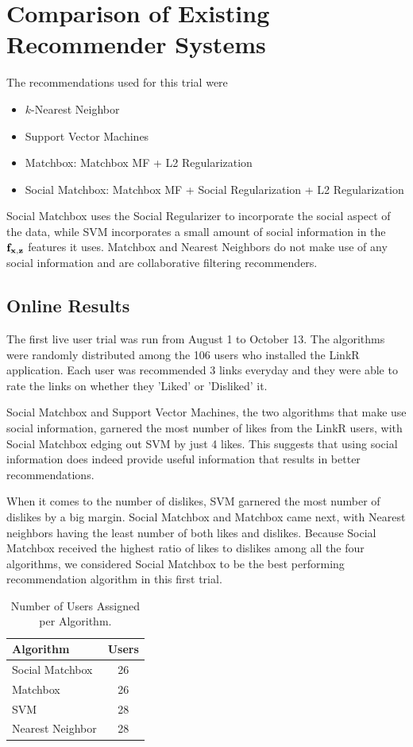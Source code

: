 \chapter{Comparison of Existing Recommender Systems}

The recommendations used for this trial were 

\begin{itemize}
\item{$k$-Nearest Neighbor}
\item{Support Vector Machines}
\item{Matchbox: Matchbox MF  + L2 Regularization}
\item{Social Matchbox: Matchbox MF + Social Regularization + L2 Regularization}
\end{itemize}

Social Matchbox uses the Social Regularizer to incorporate the social aspect of the data, while SVM incorporates a small amount of social information in the $\mathbf{f}_{\mathbf{x},\mathbf{z}}$ features it uses. Matchbox and Nearest Neighbors do not make use of any social information and are collaborative filtering recommenders.

\section{Online Results}

The first live user trial was run from August 1 to October 13. The algorithms were randomly distributed among the 106 users who installed the LinkR application. Each user was recommended 3 links everyday and they were able to rate the links on whether they 'Liked' or 'Disliked' it. 

Social Matchbox and Support Vector Machines, the two algorithms that make use social information, garnered the most number of likes from the LinkR users, with Social Matchbox edging out SVM by just 4 likes. This suggests that using social information does indeed provide useful information that results in better recommendations.

When it comes to the number of dislikes, SVM garnered the most number of dislikes by a big margin. Social Matchbox and Matchbox came next, with Nearest neighbors having the least number of both likes and dislikes. Because Social Matchbox received the highest ratio of likes to dislikes among all the four algorithms, we considered Social Matchbox to be the best performing recommendation algorithm in this first trial.

\begin{table}[h!]
\centering
\begin{tabular}{| l | c |}
\hline
{\bf Algorithm} & {\bf Users} \\
\hline
Social Matchbox & 26\\
Matchbox  & 26 \\
SVM & 28 \\
Nearest Neighbor & 28 \\
\hline
\end{tabular}
\caption{Number of Users Assigned per Algorithm.}
\end{table}

